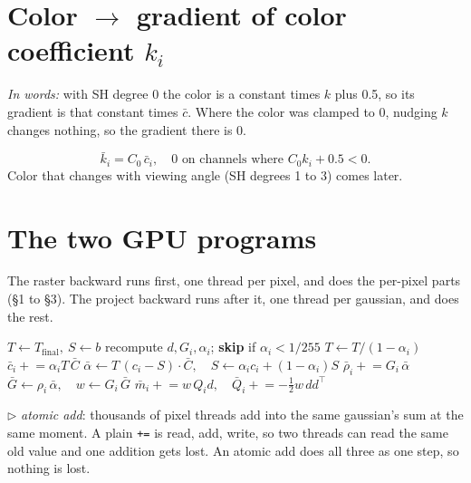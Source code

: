 \documentclass[11pt]{article}
\newcommand{\T}{^{\top}}
\newcommand{\words}[1]{\textit{In words:} #1\par}
\begin{document}
\section{Color \texorpdfstring{$\to$}{->} gradient of color coefficient $k_i$}

\words{with SH degree 0 the color is a constant times $k$ plus 0.5, so its gradient is that constant times $\bar c$. Where the color was clamped to 0, nudging $k$ changes nothing, so the gradient there is 0.}
\[
\bar k_i = C_0\, \bar c_i, \quad 0 \text{ on channels where } C_0 k_i + 0.5 < 0.
\]
Color that changes with viewing angle (SH degrees 1 to 3) comes later.

\section{The two GPU programs}

The raster backward runs first, one thread per pixel, and does the per-pixel parts (\S1 to \S3). The project backward runs after it, one thread per gaussian, and does the rest.

\begin{algorithm}[H]
\caption{Raster backward, one thread per pixel}
\begin{algorithmic}[1]
\State $T \gets T_{\text{final}},\ S \gets b$
  \State recompute $d, G_i, \alpha_i$; \textbf{skip} if $\alpha_i < 1/255$
  \State $T \gets T/(1-\alpha_i)$
  \State $\bar c_i \mathrel{+}= \alpha_i T\, \bar C$ 
  \State $\bar\alpha \gets T\,(c_i - S)\cdot\bar C,\quad S \gets \alpha_i c_i + (1-\alpha_i)S$
  \State $\bar\rho_i \mathrel{+}= G_i\, \bar\alpha$ 
  \State $\bar G \gets \rho_i\, \bar\alpha,\quad w \gets G_i\, \bar G$
  \State $\bar m_i \mathrel{+}= w\, Q_i d,\quad \bar Q_i \mathrel{+}= -\tfrac12 w\, d d\T$ 
\EndFor
\end{algorithmic}
\end{algorithm}
\vspace{-0.6em}
{\small $\triangleright$ \emph{atomic add}: thousands of pixel threads add into the same gaussian's sum at the same moment. A plain \texttt{+=} is read, add, write, so two threads can read the same old value and one addition gets lost. An atomic add does all three as one step, so nothing is lost.\par}
\end{document}
